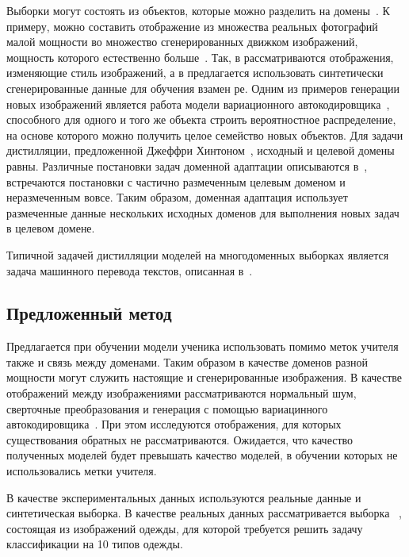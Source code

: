  Выборки могут состоять из объектов, которые можно разделить на домены~\cite{image_to_image, DA via prompt learning}. К примеру, можно составить отображение из множества реальных фотографий малой мощности во множество сгенерированных движком изображений, мощность которого естественно больше~\cite{DA,UDA}. Так, в\cite{image_to_image} рассматриваются отображения, изменяющие стиль изображений, а в\cite{DA} предлагается использовать синтетически сгенерированные данные для обучения взамен ре. Одним из примеров генерации новых изображений является работа модели вариационного автокодировщика~\cite{VAE}, способного для одного и того же объекта строить вероятностное распределение, на основе которого можно получить целое семейство новых объектов. Для задачи дистилляции, предложенной Джеффри Хинтоном~\cite{Hinton2015}, исходный и целевой домены равны. Различные постановки задач доменной адаптации описываются в~\cite{DeepvisDA}, встречаются постановки с частично размеченным целевым доменом и неразмеченным вовсе. Таким образом, доменная адаптация использует размеченные данные нескольких исходных доменов для выполнения новых задач в целевом домене.
 
Типичной задачей дистилляции моделей на многодоменных выборках является задача машинного перевода текстов, описанная в~\cite{KimRush2016}.

\subsection{Предложенный метод}

Предлагается при обучении модели ученика использовать помимо меток учителя также и связь между доменами. Таким образом в качестве доменов разной мощности могут служить настоящие и сгенерированные изображения. В качестве отображений между изображениями рассматриваются нормальный шум, сверточные преобразования и генерация с помощью вариацинного автокодировщика~\cite{VAE}. При этом исследуются отображения, для которых существования обратных не рассматриваются. Ожидается, что качество полученных моделей будет превышать качество моделей, в обучении которых не использовались метки учителя.

В качестве экспериментальных данных используются реальные данные и синтетическая выборка. В качестве реальных данных рассматривается выборка ~\cite{FMNIST}, состоящая из изображений одежды, для которой требуется решить задачу классификации на 10 типов одежды.\\


